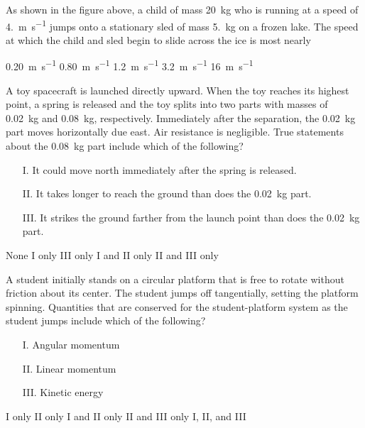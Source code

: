 \documentclass[12pt]{../../oss-classkick-exam}
\begin{document}
\begin{questions}
  
  \question As shown in the figure above, a child of mass \SI{20}{\kilo\gram}
  who is running at a speed of \SI{4.}{\metre\per\second} jumps onto a
  stationary sled of mass \SI{5.}{\kilo\gram} on a frozen lake. The speed at
  which the child and sled begin to slide across the ice is most nearly
  \begin{choices}
    \choice \SI{.20}{\metre\per\second}
    \choice \SI{.80}{\metre\per\second}
    \choice \SI{1.2}{\metre\per\second}
    \choice \SI{3.2}{\metre\per\second}
    \choice \SI{16}{\metre\per\second}
  \end{choices}
  
  \question A toy spacecraft is launched directly upward. When the toy reaches
  its highest point, a spring is released and the toy splits into two parts
  with masses of \SI{.02}{\kilo\gram} and \SI{.08}{\kilo\gram}, respectively.
  Immediately after the separation, the \SI{.02}{\kilo\gram} part moves
  horizontally due east. Air resistance is negligible. True statements about
  the \SI{.08}{\kilo\gram} part include which of the following?
  \begin{enumerate}[nosep]
  \item[I.] It could move north immediately after the spring is released.
  \item[II.] It takes longer to reach the ground than does the
    \SI{.02}{\kilo\gram} part.
  \item[III.] It strikes the ground farther from the launch point than does the
    \SI{.02}{\kilo\gram} part.
  \end{enumerate}
  \begin{choices}
    \choice None
    \choice I only
    \choice III only
    \choice I and II only
    \choice II and III only
  \end{choices}
  
  \question A student initially stands on a circular platform that is free to
  rotate without friction about its center. The student jumps off tangentially,
  setting the platform spinning. Quantities that are conserved for the
  student-platform system as the student jumps include which of the following?
  \begin{enumerate}[nosep]
  \item[I.] Angular momentum
  \item[II.] Linear momentum
  \item[III.] Kinetic energy
  \end{enumerate}  
  \begin{choices}
    \choice I only
    \choice II only
    \choice I and II only
    \choice II and III only
    \choice I, II, and III
  \end{choices}
  

\end{questions}
\end{document}
